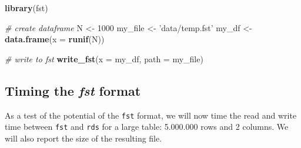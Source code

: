 \documentclass[
  12pt,
]{book}
\newenvironment{Shaded}{\begin{snugshade}}{\end{snugshade}}
\newcommand{\CommentTok}[1]{\textcolor[rgb]{0.37,0.37,0.37}{\textit{#1}}}
\newcommand{\DataTypeTok}[1]{\textcolor[rgb]{0.27,0.27,0.27}{#1}}
\newcommand{\DecValTok}[1]{\textcolor[rgb]{0.06,0.06,0.06}{#1}}
\newcommand{\KeywordTok}[1]{\textcolor[rgb]{0.27,0.27,0.27}{\textbf{#1}}}
\newcommand{\NormalTok}[1]{#1}
\newcommand{\StringTok}[1]{\textcolor[rgb]{0.5,0.5,0.5}{#1}}
\begin{document}
\begin{Shaded}
\begin{Highlighting}[]
\KeywordTok{library}\NormalTok{(fst)}

\CommentTok{# create dataframe}
\NormalTok{N <-}\StringTok{ }\DecValTok{1000}
\NormalTok{my_file <-}\StringTok{ 'data/temp.fst'}
\NormalTok{my_df <-}\StringTok{ }\KeywordTok{data.frame}\NormalTok{(}\DataTypeTok{x =} \KeywordTok{runif}\NormalTok{(N))}

\CommentTok{# write to fst}
\KeywordTok{write_fst}\NormalTok{(}\DataTypeTok{x =}\NormalTok{ my_df, }\DataTypeTok{path =}\NormalTok{ my_file)}
\end{Highlighting}
\end{Shaded}

\hypertarget{timing-the-fst-format}{%
\subsection{\texorpdfstring{Timing the \emph{fst} format}{Timing the fst format}}\label{timing-the-fst-format}}

As a test of the potential of the \texttt{fst} format, we will now time the read and write time between \texttt{fst} and \texttt{rds} for a large table: 5.000.000 rows and 2 columns. We will also report the size of the resulting file.
\end{document}
